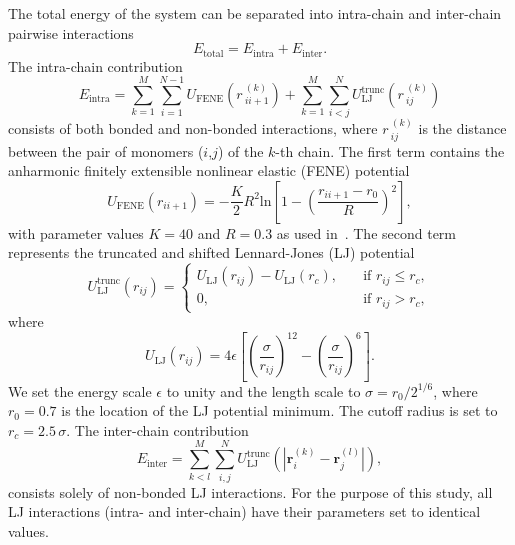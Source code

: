 \documentclass[12pt]{report}
\begin{document}
 The total energy of
the system can be separated into intra-chain and inter-chain
pairwise interactions
\begin{equation}
E_{\mathrm{total}} = E_{\mathrm{intra}} + E_{\mathrm{inter}}.
\end{equation}
%
The intra-chain contribution 
\begin{equation}
E_{\mathrm{intra}} = \sum^{M}_{k = 1}\sum^{N-1}_{i = 1}
U_{\mathrm{FENE}}(r\,^{(k)}_{ii+1}) +
\sum^{M}_{k=1}\sum^{N}_{i<j}
U_{\mathrm{LJ}}^{\mathrm{trunc}}(r\,^{(k)}_{ij})
\end{equation}
%
consists of both bonded and non-bonded interactions, where
$r\,^{(k)}_{ij}$ is the distance between the pair of monomers
($i$,$j$) of the $k$-th chain. The first term contains the anharmonic
finitely extensible nonlinear elastic (FENE)
potential~\cite{Bird1987, Kremer1990, Milchev2001}
\begin{equation}
U_{\mathrm{FENE}}(r_{ii+1})=-\frac{K}{2}R^2 
\mathrm{ln}\left[1-\left(\frac{r_{ii+1}-r_0}{R}\right)^2\right],	
\label{FENE}
\end{equation}
%
with parameter values $K=40$ and $R=0.3$ as used in~\cite{Gross2013}.
The second term represents 
the truncated and shifted Lennard-Jones (LJ) potential
\begin{equation}
U_{\mathrm{LJ}}^{\mathrm{trunc}}(r_{ij}) = \left\{
\begin{array}{lr}
U_{\mathrm{LJ}}(r_{ij}) - U_{\mathrm{LJ}}(r_{c}), & \quad
\mathrm{if} \,\, r_{ij} \leq r_{c},\\
0, &  \quad \mathrm{if} \,\,r_{ij} > r_{c},
\end{array}
\right.
\end{equation}
%
where
\begin{equation}
U_{\mathrm{LJ}}(r_{ij})= 4\epsilon \left[ \left(
\frac{\sigma}{r_{ij}} \right)^{12} - \left(
\frac{\sigma}{r_{ij}} \right)^{6} \right].
\end{equation}
%
We set the energy scale $\epsilon$ to unity and the length scale
to $\sigma=r_0/2^{1/6}$, where $r_0 = 0.7$ is the location of
the LJ potential minimum. The cutoff radius is set to
$r_c=2.5\,\sigma$.
The inter-chain contribution
\begin{equation}
E_{\mathrm{inter}} = \sum^{M}_{k < l}
\sum^{N}_{i,j}U_{\mathrm{LJ}}^{\mathrm{trunc}}(|\textbf{r}^{(k)}_{i}
- \textbf{r}^{(l)}_{j}|),
\end{equation}
%
consists solely of non-bonded LJ interactions. For the purpose
of this study, all LJ interactions (intra- and inter-chain) have
their parameters set to identical values.
\end{document}
